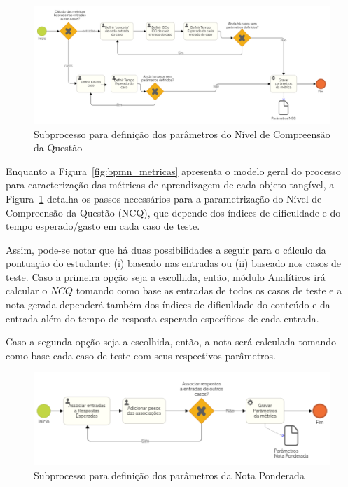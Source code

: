 \begin{figure}[htb]
	\centering
	\includegraphics[width=0.9\linewidth]{chapters/proposedMethod/bpmn_metricas_NCQ.png}
	\caption{Subprocesso para definição dos parâmetros do Nível de Compreensão da Questão}
	\label{fig:bpmn_metricas_NCQ}
\end{figure}

Enquanto a Figura~\ref{fig:bpmn_metricas} apresenta o modelo geral do processo para caracterização das métricas de aprendizagem de cada objeto tangível, a Figura~\ref{fig:bpmn_metricas_NCQ} detalha os passos necessários para a parametrização do Nível de Compreensão da Questão (NCQ), que depende dos índices de dificuldade e do tempo esperado/gasto em cada caso de teste.

Assim, pode-se notar que há duas possibilidades a seguir para o cálculo da pontuação do estudante: (i) baseado nas entradas ou (ii) baseado nos casos de teste. Caso a primeira opção seja a escolhida, então, módulo Analíticos irá calcular o $NCQ$ tomando como base as entradas de todos os casos de teste e a nota gerada dependerá também dos índices de dificuldade do conteúdo e da entrada além do tempo de resposta esperado específicos de cada entrada.

Caso a segunda opção seja a escolhida, então, a nota será calculada tomando como base cada caso de teste com seus respectivos parâmetros.

\begin{figure}[htb]
	\centering
	\includegraphics[width=0.9\linewidth]{chapters/proposedMethod/bpmn_metricas_NP.png}
	\caption{Subprocesso para definição dos parâmetros da Nota Ponderada}
	\label{fig:bpmn_metricas_NP}
\end{figure}

